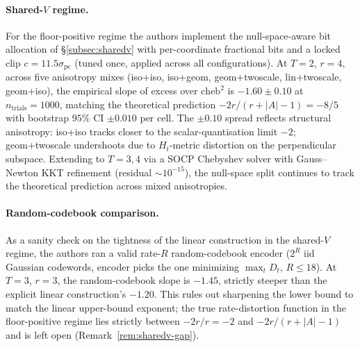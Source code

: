 \paragraph{Shared-$V$ regime.} For the floor-positive regime the authors
implement the null-space-aware bit allocation of \S\ref{subsec:sharedv}
with per-coordinate fractional bits and a locked clip
$c = 11.5\sigma_{\mathrm{pc}}$ (tuned once, applied across all
configurations). At $T = 2$, $r = 4$, across five anisotropy mixes
(iso+iso, iso+geom, geom+twoscale, lin+twoscale, geom+iso), the
empirical slope of excess over $\mathrm{cheb}^2$ is $-1.60 \pm 0.10$ at
$n_{\mathrm{trials}} = 1000$, matching the theoretical prediction
$-2r/(r + |A| - 1) = -8/5$ with bootstrap $95\%$ CI $\pm 0.010$ per
cell. The $\pm 0.10$ spread reflects structural anisotropy: iso+iso
tracks closer to the scalar-quantisation limit $-2$; geom+twoscale
undershoots due to $H_t$-metric distortion on the perpendicular
subspace. Extending to $T = 3, 4$ via a SOCP Chebyshev solver with
Gauss--Newton KKT refinement (residual $\sim 10^{-15}$), the null-space
split continues to track the theoretical prediction across mixed
anisotropies.

\paragraph{Random-codebook comparison.} As a sanity check on the
tightness of the linear construction in the shared-$V$ regime, the authors ran
a valid rate-$R$ random-codebook encoder ($2^R$ iid Gaussian
codewords, encoder picks the one minimizing $\max_t D_t$,
$R \leq 18$). At $T = 3$, $r = 3$, the random-codebook slope is
$-1.45$, strictly steeper than the explicit linear construction's
$-1.20$. This rules out sharpening the lower bound to match the linear
upper-bound exponent; the true rate-distortion function in the
floor-positive regime lies strictly between $-2r/r = -2$ and
$-2r/(r + |A| - 1)$ and is left open (Remark~\ref{rem:sharedv-gap}).
